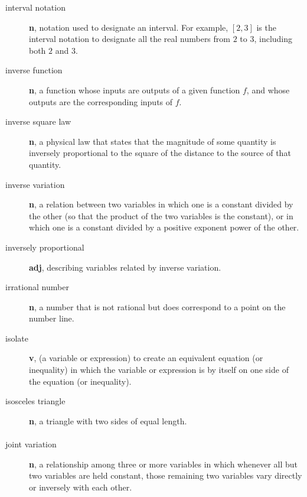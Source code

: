 \documentclass[10pt,]{book}
\newcommand{\terminology}[1]{\textbf{#1}}
\theoremstyle{plain}
\theoremstyle{definition}
\theoremstyle{definition}
\theoremstyle{definition}
\numberwithin{equation}{part}
\begin{document}
\begin{description}
\item[{interval notation}]\hypertarget{li-639}{}\terminology{n}, notation used to designate an interval. For example, \([2, 3]\) is the interval notation to designate all the real numbers from \(2\) to \(3\), including both \(2\) and \(3\).%
\item[{inverse function}]\hypertarget{li-640}{}\terminology{n}, a function whose inputs are outputs of a given function \(f\), and whose outputs are the corresponding inputs of \(f\).%
\item[{inverse square law}]\hypertarget{li-641}{}\terminology{n}, a physical law that states that the magnitude of some quantity is inversely proportional to the square of the distance to the source of that quantity.%
\item[{inverse variation}]\hypertarget{li-642}{}\terminology{n}, a relation between two variables in which one is a constant divided by the other (so that the product of the two variables is the constant), or in which one is a constant divided by a positive exponent power of the other.%
\item[{inversely proportional}]\hypertarget{li-643}{}\terminology{adj}, describing variables related by inverse variation.%
\item[{irrational number}]\hypertarget{li-644}{}\terminology{n}, a number that is not rational but does correspond to a point on the number line.%
\item[{isolate}]\hypertarget{li-645}{}\terminology{v}, (a variable or expression) to create an equivalent equation (or inequality) in which the variable or expression is by itself on one side of the equation (or inequality).%
\item[{isosceles triangle}]\hypertarget{li-646}{}\terminology{n}, a triangle with two sides of equal length.%
\end{description}
%
\typeout{************************************************}
\typeout{************************************************}
\paragraph[{}]{}\hypertarget{paragraphs-14}{}
\leavevmode%
\begin{description}
\item[{joint variation}]\hypertarget{li-647}{}\terminology{n}, a relationship among three or more variables in which whenever all but two variables are held constant, those remaining two variables vary directly or inversely with each other.%
\end{description}
%
\typeout{************************************************}
\typeout{************************************************}
\end{document}
